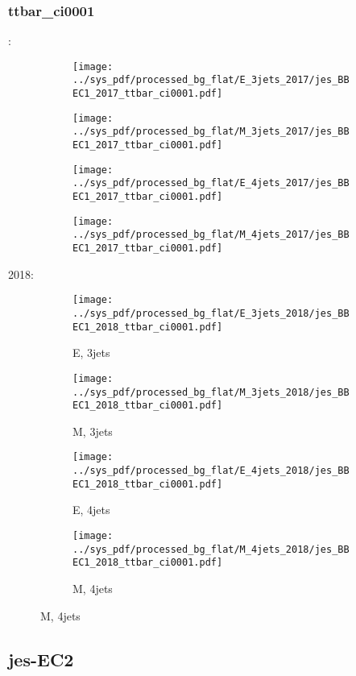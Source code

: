 \documentclass{beamer}
\begin{document}
\begin{frame}
\frametitle{ttbar_ci0001}
\fontsize{5}{1}:
\begin{figure}
\centering
\begin{subfigure}[b]{0.24\textwidth}
\texttt{[image: ../sys\_pdf/processed\_bg\_flat/E\_3jets\_2017/jes\_BBEC1\_2017\_ttbar\_ci0001.pdf]}
\end{subfigure}
\begin{subfigure}[b]{0.24\textwidth}
\texttt{[image: ../sys\_pdf/processed\_bg\_flat/M\_3jets\_2017/jes\_BBEC1\_2017\_ttbar\_ci0001.pdf]}
\end{subfigure}
\begin{subfigure}[b]{0.24\textwidth}
\texttt{[image: ../sys\_pdf/processed\_bg\_flat/E\_4jets\_2017/jes\_BBEC1\_2017\_ttbar\_ci0001.pdf]}
\end{subfigure}
\begin{subfigure}[b]{0.24\textwidth}
\texttt{[image: ../sys\_pdf/processed\_bg\_flat/M\_4jets\_2017/jes\_BBEC1\_2017\_ttbar\_ci0001.pdf]}
\end{subfigure}
\end{figure}
2018:
\begin{figure}
\centering
\begin{subfigure}[b]{0.24\textwidth}
\texttt{[image: ../sys\_pdf/processed\_bg\_flat/E\_3jets\_2018/jes\_BBEC1\_2018\_ttbar\_ci0001.pdf]}
\captionsetup{font=tiny}
\caption{E, 3jets}
\end{subfigure}
\begin{subfigure}[b]{0.24\textwidth}
\texttt{[image: ../sys\_pdf/processed\_bg\_flat/M\_3jets\_2018/jes\_BBEC1\_2018\_ttbar\_ci0001.pdf]}
\captionsetup{font=tiny}
\caption{M, 3jets}
\end{subfigure}
\begin{subfigure}[b]{0.24\textwidth}
\texttt{[image: ../sys\_pdf/processed\_bg\_flat/E\_4jets\_2018/jes\_BBEC1\_2018\_ttbar\_ci0001.pdf]}
\captionsetup{font=tiny}
\caption{E, 4jets}
\end{subfigure}
\begin{subfigure}[b]{0.24\textwidth}
\texttt{[image: ../sys\_pdf/processed\_bg\_flat/M\_4jets\_2018/jes\_BBEC1\_2018\_ttbar\_ci0001.pdf]}
\captionsetup{font=tiny}
\caption{M, 4jets}
\end{subfigure}
\end{figure}
\end{frame}


\subsection{jes-EC2}
\end{document}
